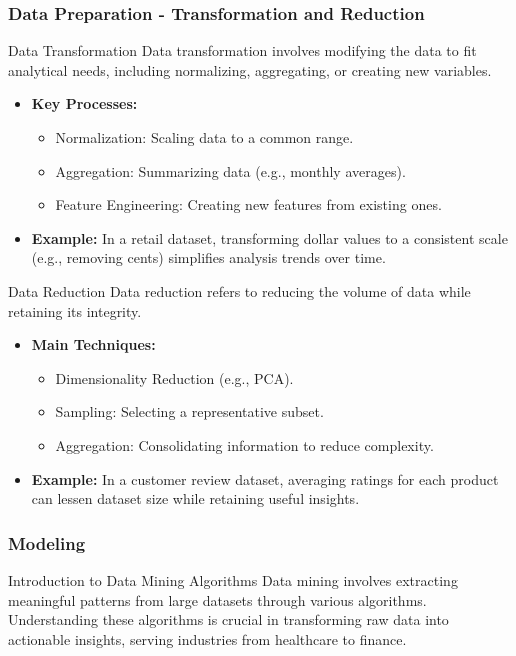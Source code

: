 \documentclass[aspectratio=169]{beamer}
\begin{document}
\begin{frame}[fragile]
    \frametitle{Data Preparation - Transformation and Reduction}
    \begin{block}{Data Transformation}
        Data transformation involves modifying the data to fit analytical needs, including normalizing, aggregating, or creating new variables.
    \end{block}
    \begin{itemize}
        \item \textbf{Key Processes:}
        \begin{itemize}
            \item Normalization: Scaling data to a common range.
            \item Aggregation: Summarizing data (e.g., monthly averages).
            \item Feature Engineering: Creating new features from existing ones.
        \end{itemize}
        
        \item \textbf{Example:}
        In a retail dataset, transforming dollar values to a consistent scale (e.g., removing cents) simplifies analysis trends over time.
    \end{itemize}
    
    \begin{block}{Data Reduction}
        Data reduction refers to reducing the volume of data while retaining its integrity. 
    \end{block}
    \begin{itemize}
        \item \textbf{Main Techniques:}
        \begin{itemize}
            \item Dimensionality Reduction (e.g., PCA).
            \item Sampling: Selecting a representative subset.
            \item Aggregation: Consolidating information to reduce complexity.
        \end{itemize}
        
        \item \textbf{Example:}
        In a customer review dataset, averaging ratings for each product can lessen dataset size while retaining useful insights.
    \end{itemize}
\end{frame}

\begin{frame}[fragile]
    \frametitle{Modeling}
    
    \begin{block}{Introduction to Data Mining Algorithms}
        Data mining involves extracting meaningful patterns from large datasets through various algorithms. Understanding these algorithms is crucial in transforming raw data into actionable insights, serving industries from healthcare to finance.
    \end{block}
\end{frame}
\end{document}
